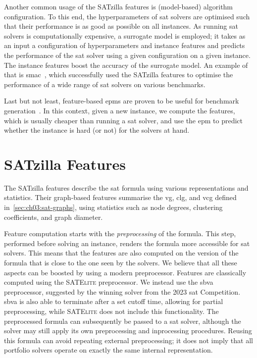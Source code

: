 Another common usage of the SATzilla features is (model-based) algorithm configuration. To this end, the hyperparameters of \gls{sat} solvers are optimised such that their performance is as good as possible on all instances. As running \gls{sat} solvers is computationally expensive, a surrogate model is employed; it takes as an input a configuration of hyperparameters and instance features and predicts the performance of the \gls{sat} solver using a given configuration on a given instance. The instance features boost the accuracy of the surrogate model. An example of that is \gls{smac}~\cite{HutEtAl11}, which successfully used the SATzilla features to optimise the performance of a wide range of \gls{sat} solvers on various benchmarks.

Last but not least, feature-based \glspl{epm} are proven to be useful for benchmark generation~\cite{LeyEtAl09}. In this context, given a new instance, we compute the features, which is usually cheaper than running a \gls{sat} solver, and use the \gls{epm} to predict whether the instance is hard (or not) for the solvers at hand.

\section{SATzilla Features}
\label{sec:ch04:satzilla-features}

The SATzilla features describe the \gls{sat} formula using various representations and statistics. Their graph-based features summarise the \gls{vg}, \gls{clg}, and \gls{vcg} defined in~\cref{sec:ch03:sat-graphs}, using statistics such as node degrees, clustering coefficients, and graph diameter.

Feature computation starts with the \emph{preprocessing} of the formula. This step, performed before solving an instance, renders the formula more accessible for \gls{sat} solvers. This means that the features are also computed on the version of the formula that is close to the one seen by the solvers. We believe that all these aspects can be boosted by using a modern preprocessor.
Features are classically computed using the \textsc{SATElite} preprocessor. We instead use the \gls{sbva} preprocessor, suggested by the winning solver from the 2023 \gls{sat} Competition. \gls{sbva} is also able to terminate after a set cutoff time, allowing for partial preprocessing, while \textsc{SATElite} does not include this functionality.
The preprocessed formula can subsequently be passed to a \gls{sat} solver, although the solver may still apply its own preprocessing and inprocessing procedures. Reusing this formula can avoid repeating external preprocessing; it does not imply that all portfolio solvers operate on exactly the same internal representation.

